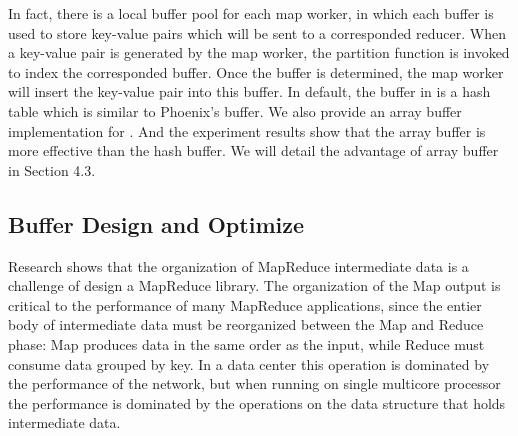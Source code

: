 In fact, there is a local buffer pool for each map worker, in which each buffer is used to store key-value  pairs which will be sent to a corresponded reducer.
When a key-value pair is generated by the map worker, the partition function is invoked to index the corresponded buffer.
Once the buffer is determined, the map worker will insert the key-value pair into this buffer.
In default, the buffer in \myds is a hash table which is similar to Phoenix's buffer.
We also provide an array buffer implementation for \myds.
And the experiment results show that the array buffer is more effective than the hash buffer. 
We will detail the advantage of array buffer in Section 4.3.







%



\subsection{Buffer Design and Optimize}
Research shows that the organization of MapReduce
intermediate data is a challenge of design a  MapReduce library.
The organization of the Map output is critical to the
performance of many MapReduce applications, 
since the entier body of intermediate data must be
reorganized between the Map and Reduce phase:
Map produces data in the same order as the input,
while Reduce must consume data grouped by key.\cite{mao2010metis}
In a data center this operation is dominated by
the performance of the network, but when running 
on single multicore processor the performance
is dominated by the operations on the data structure
that holds intermediate data.

